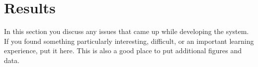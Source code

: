 \chapter{Results}

In this section you discuss any issues that came up while developing
the system.  If you found something particularly interesting,
difficult, or an important learning experience, put it here.  This is
also a good place to put additional figures and data.


